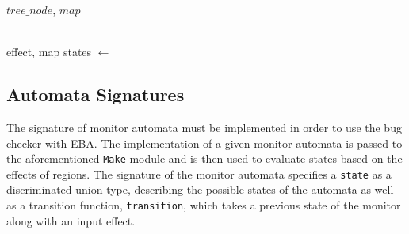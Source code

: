 \begin{algorithm}[H]
\begin{algorithmic}
     {$tree\_node$, $map$} 
            \EndIf
            

        \EndIf      
    \EndFunction
    \\
     {effect, map}
        \State states $\gets$ 
    \EndFunction
    \\
\end{algorithmic}
\end{algorithm}

\subsection{Automata Signatures}

The signature of monitor automata must be implemented in order to use the bug checker with EBA. The implementation of a given monitor automata is passed to the aforementioned \texttt{Make} module and is then used to evaluate states based on the effects of regions. The signature of the monitor automata specifies a \texttt{state} as a discriminated union type, describing the possible states of the automata as well as a transition function, \texttt{transition}, which takes a previous state of the monitor along with an input effect. 


